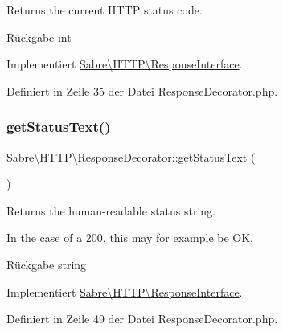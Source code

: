 Returns the current H\+T\+TP status code.

\begin{DoxyReturn}{Rückgabe}
int 
\end{DoxyReturn}


Implementiert \mbox{\hyperlink{interface_sabre_1_1_h_t_t_p_1_1_response_interface_a4424cb29068d23ac01d92fdaf97351c8}{Sabre\textbackslash{}\+H\+T\+T\+P\textbackslash{}\+Response\+Interface}}.



Definiert in Zeile 35 der Datei Response\+Decorator.\+php.

\mbox{\label{class_sabre_1_1_h_t_t_p_1_1_response_decorator_a74d8862eeb17eeba7777ba54e0456918}} 
\subsubsection{\texorpdfstring{get\+Status\+Text()}{getStatusText()}}
{\footnotesize\ttfamily Sabre\textbackslash{}\+H\+T\+T\+P\textbackslash{}\+Response\+Decorator\+::get\+Status\+Text (\begin{DoxyParamCaption}{ }\end{DoxyParamCaption})}

Returns the human-\/readable status string.

In the case of a 200, this may for example be \textquotesingle{}OK\textquotesingle{}.

\begin{DoxyReturn}{Rückgabe}
string 
\end{DoxyReturn}


Implementiert \mbox{\hyperlink{interface_sabre_1_1_h_t_t_p_1_1_response_interface_a5fe5d34d36b2fa98e074a463f8368427}{Sabre\textbackslash{}\+H\+T\+T\+P\textbackslash{}\+Response\+Interface}}.



Definiert in Zeile 49 der Datei Response\+Decorator.\+php.

\mbox{\label{class_sabre_1_1_h_t_t_p_1_1_response_decorator_a0b3f39d2f9af949ab2a1cd63516f2934}} 

